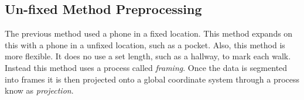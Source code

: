 \documentclass{sig-alternate}
\begin{document}
\subsection{Un-fixed Method Preprocessing}{
	The previous method used a phone in a fixed location. This method expands on this with a phone in a unfixed location, such as a pocket. Also, this method is more flexible. It does no use a set length, such as a hallway, to mark each walk. Instead this method uses a process called \textit{framing}. Once the data is segmented into frames it is then projected onto a global coordinate system through a process know as \textit{projection}.}
		
\end{document}
